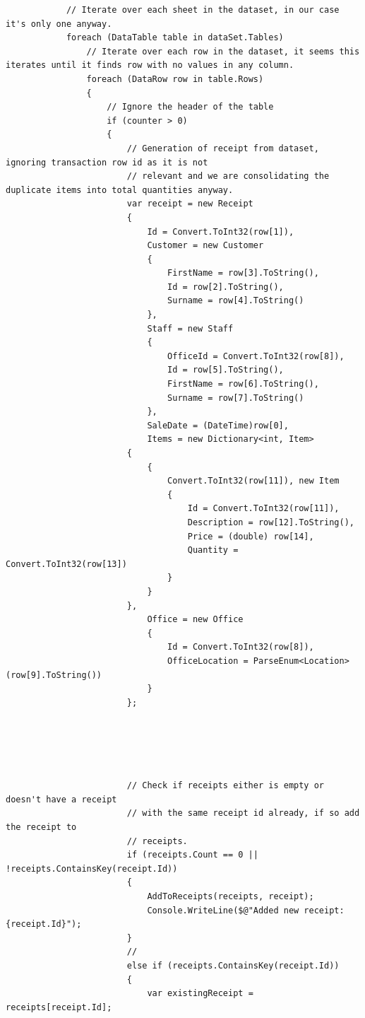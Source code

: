 \documentclass{article}
\begin{document}
\begin{lstlisting}
            // Iterate over each sheet in the dataset, in our case it's only one anyway.
            foreach (DataTable table in dataSet.Tables)
                // Iterate over each row in the dataset, it seems this iterates until it finds row with no values in any column.
                foreach (DataRow row in table.Rows)
                {
                    // Ignore the header of the table
                    if (counter > 0)
                    {
                        // Generation of receipt from dataset, ignoring transaction row id as it is not 
                        // relevant and we are consolidating the duplicate items into total quantities anyway. 
                        var receipt = new Receipt
                        {
                            Id = Convert.ToInt32(row[1]),
                            Customer = new Customer
                            {
                                FirstName = row[3].ToString(),
                                Id = row[2].ToString(),
                                Surname = row[4].ToString()
                            },
                            Staff = new Staff
                            {
                                OfficeId = Convert.ToInt32(row[8]),
                                Id = row[5].ToString(),
                                FirstName = row[6].ToString(),
                                Surname = row[7].ToString()
                            },
                            SaleDate = (DateTime)row[0],
                            Items = new Dictionary<int, Item>
                        {
                            {
                                Convert.ToInt32(row[11]), new Item
                                {
                                    Id = Convert.ToInt32(row[11]),
                                    Description = row[12].ToString(),
                                    Price = (double) row[14],
                                    Quantity = Convert.ToInt32(row[13])
                                }
                            }
                        },
                            Office = new Office
                            {
                                Id = Convert.ToInt32(row[8]),
                                OfficeLocation = ParseEnum<Location>(row[9].ToString())
                            }
                        };





                        // Check if receipts either is empty or doesn't have a receipt 
                        // with the same receipt id already, if so add the receipt to 
                        // receipts.
                        if (receipts.Count == 0 || !receipts.ContainsKey(receipt.Id))
                        {
                            AddToReceipts(receipts, receipt);
                            Console.WriteLine($@"Added new receipt: {receipt.Id}");
                        }
                        // 
                        else if (receipts.ContainsKey(receipt.Id))
                        {
                            var existingReceipt = receipts[receipt.Id];


\end{lstlisting}
\end{document}
